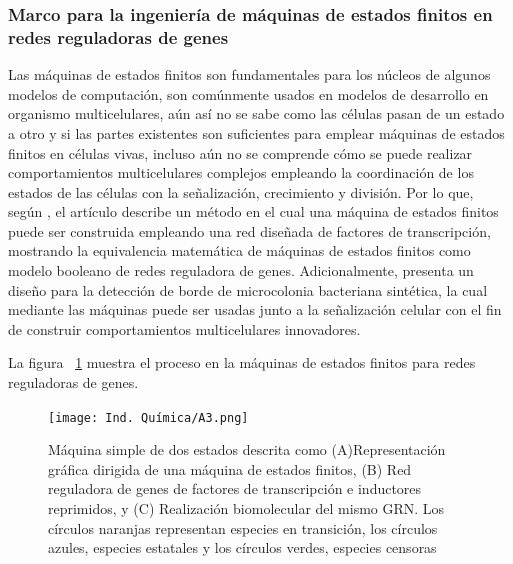 \documentclass[10pt,conference]{IEEEtran}
\begin{document}
\subsubsection{\textbf{Marco para la ingeniería de máquinas de estados finitos en redes reguladoras de genes}}
Las máquinas de estados finitos son fundamentales para los núcleos de algunos modelos de computación, son comúnmente usados en modelos de desarrollo en organismo multicelulares, aún así no se sabe como las células pasan de un estado a otro y si las partes existentes son suficientes para emplear máquinas de estados finitos en células vivas, incluso aún no se comprende cómo se puede realizar comportamientos multicelulares complejos empleando la coordinación de los estados de las células con la señalización, crecimiento y división. Por lo que, según , el artículo describe un método  en el cual una máquina de estados finitos puede ser construida empleando una red diseñada de factores de transcripción, mostrando la equivalencia matemática de máquinas de estados finitos como modelo booleano de redes reguladora de genes.
Adicionalmente, presenta un diseño para la detección de borde de microcolonia bacteriana sintética, la cual mediante las máquinas puede ser usadas junto a la señalización celular con el fin de construir comportamientos multicelulares innovadores.

La figura ~\ref{Quimica2} muestra el proceso en la máquinas de estados finitos para redes reguladoras de genes.
\begin{figure}[H]
 \begin{center}
       \texttt{[image: Ind. Química/A3.png]}
      \caption{Máquina simple de dos estados descrita como (A)Representación gráfica dirigida de una máquina de estados finitos, (B) Red reguladora de genes de factores de transcripción e inductores reprimidos, y (C) Realización biomolecular del mismo GRN. Los círculos naranjas representan especies en transición, los círculos azules, especies estatales y los círculos verdes, especies censoras}
      \label{Quimica2} 
      \end{center}
\end{figure}
\end{document}
